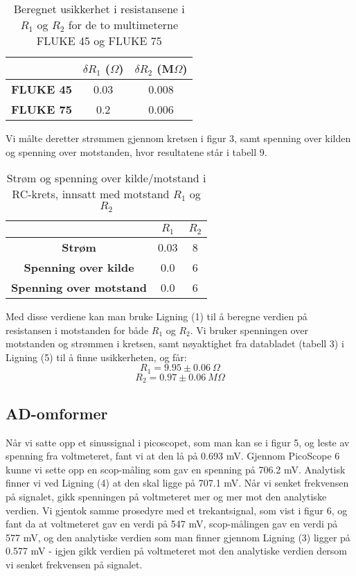 \documentclass[norsk,a4paper,12pt]{article}
\begin{document}
\begin{table}
  \begin{center}
  \caption{Beregnet usikkerhet i resistansene i $R_1$ og $R_2$ for de to multimeterne FLUKE 45 og FLUKE 75}
  \begin{tabular}{|c|c|c|} \hline
  \textit{} & \textbf{$\delta R_1$ ($\Omega$)} & \textbf{$\delta R_2$ (M$\Omega$)} \\ \hline
  \textbf{FLUKE 45} & 0.03 & 0.008 \\ \hline
  \textbf{FLUKE 75} & 0.2 & 0.006 \\ \hline
  \end{tabular}
  \end{center}
  \label{tab:usikkerhet}
\end{table}


Vi målte deretter strømmen gjennom kretsen i figur 3, samt spenning over kilden og spenning over motstanden, hvor resultatene står i tabell 9.


\begin{table}
  \begin{center}
  \caption{Strøm og spenning over kilde/motstand i RC-krets, innsatt med motstand $R_1$ og $R_2$}
  \begin{tabular}{|c|c|c|} \hline
  \textit{} & \textbf{$R_1$} & \textbf{$R_2$} \\ \hline
  \textbf{Strøm} & 0.03 & 8 \\ \hline
  \textbf{Spenning over kilde} & 0.0 & 6 \\ \hline
  \textbf{Spenning over motstand} & 0.0 & 6 \\ \hline
  \end{tabular}
  \end{center}
  \label{tab:strømogspenning}
\end{table}

Med disse verdiene kan man bruke Ligning (1) til å beregne verdien på resistansen i motstanden for både $R_1$ og $R_2$. Vi bruker spenningen over motstanden og strømmen i kretsen, samt nøyaktighet fra databladet (tabell 3) i Ligning (5) til å finne usikkerheten, og får:
\[R_1 = 9.95 \pm 0.06 \ \Omega\]
\[R_2 = 0.97 \pm 0.06 \ M\Omega\]

\subsection{AD-omformer}

Når vi satte opp et sinussignal i picoscopet, som man kan se i figur 5, og leste av spenning fra voltmeteret, fant vi at den lå på 0.693 mV. Gjennom PicoScope 6 kunne vi sette opp en scop-måling som gav en spenning på 706.2 mV. Analytisk finner vi ved Ligning (4) at den skal ligge på 707.1 mV. Når vi senket frekvensen på signalet, gikk spenningen på voltmeteret mer og mer mot den analytiske verdien.
Vi gjentok samme prosedyre med et trekantsignal, som vist i figur 6, og fant da at voltmeteret gav en verdi på 547 mV, scop-målingen gav en verdi på 577 mV, og den analytiske verdien som man finner gjennom Ligning (3) ligger på 0.577 mV - igjen gikk verdien på voltmeteret mot den analytiske verdien dersom vi senket frekvensen på signalet.
\end{document}
